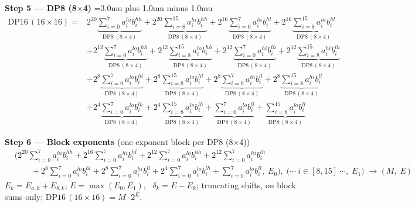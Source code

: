 \documentclass[fleqn]{article}
\newcommand{\DPop}[3]{\mathrm{DP#1}\,(#2\!\times\!#3)}
\begin{document}
\textbf{Step 5 --- DP8 (8$\times$4)}
{\medmuskip=3.0mu plus 1.0mu minus 1.0mu
\begin{align*}
\DPop{16}{16}{16} = {}
  & 2^{20} \underbrace{\sum_{i=0}^{7} a_i^{hi} b_i^{hh}}_{\DPop{8}{8}{4}}
  + 2^{20} \underbrace{\sum_{i=8}^{15} a_i^{hi} b_i^{hh}}_{\DPop{8}{8}{4}}
  + 2^{16} \underbrace{\sum_{i=0}^{7} a_i^{hi} b_i^{hl}}_{\DPop{8}{8}{4}}
  + 2^{16} \underbrace{\sum_{i=8}^{15} a_i^{hi} b_i^{hl}}_{\DPop{8}{8}{4}} \\[0.3em]
  & + 2^{12} \underbrace{\sum_{i=0}^{7} a_i^{lo} b_i^{hh}}_{\DPop{8}{8}{4}}
  + 2^{12} \underbrace{\sum_{i=8}^{15} a_i^{lo} b_i^{hh}}_{\DPop{8}{8}{4}}
  + 2^{12} \underbrace{\sum_{i=0}^{7} a_i^{hi} b_i^{lh}}_{\DPop{8}{8}{4}}
  + 2^{12} \underbrace{\sum_{i=8}^{15} a_i^{hi} b_i^{lh}}_{\DPop{8}{8}{4}} \\[0.3em]
  & + 2^{8} \underbrace{\sum_{i=0}^{7} a_i^{lo} b_i^{hl}}_{\DPop{8}{8}{4}}
  + 2^{8} \underbrace{\sum_{i=8}^{15} a_i^{lo} b_i^{hl}}_{\DPop{8}{8}{4}}
  + 2^{8} \underbrace{\sum_{i=0}^{7} a_i^{hi} b_i^{ll}}_{\DPop{8}{8}{4}}
  + 2^{8} \underbrace{\sum_{i=8}^{15} a_i^{hi} b_i^{ll}}_{\DPop{8}{8}{4}} \\[0.3em]
  & + 2^{4} \underbrace{\sum_{i=0}^{7} a_i^{lo} b_i^{lh}}_{\DPop{8}{8}{4}}
  + 2^{4} \underbrace{\sum_{i=8}^{15} a_i^{lo} b_i^{lh}}_{\DPop{8}{8}{4}}
  + \underbrace{\sum_{i=0}^{7} a_i^{lo} b_i^{ll}}_{\DPop{8}{8}{4}}
  + \underbrace{\sum_{i=8}^{15} a_i^{lo} b_i^{ll}}_{\DPop{8}{8}{4}}
\end{align*}
}

\textbf{Step 6 --- Block exponents}\quad
{\small(one exponent block per DP8 (8$\times$4))}
\begin{align*}
&\Big(2^{20}\!\sum_{i=0}^{7} a_i^{hi} b_i^{hh} + 2^{16}\!\sum_{i=0}^{7} a_i^{hi} b_i^{hl} + 2^{12}\!\sum_{i=0}^{7} a_i^{lo} b_i^{hh} + 2^{12}\!\sum_{i=0}^{7} a_i^{hi} b_i^{lh} \\
&\qquad + 2^{8}\!\sum_{i=0}^{7} a_i^{lo} b_i^{hl} + 2^{8}\!\sum_{i=0}^{7} a_i^{hi} b_i^{ll} + 2^{4}\!\sum_{i=0}^{7} a_i^{lo} b_i^{lh} + \sum_{i=0}^{7} a_i^{lo} b_i^{ll},\; E_0\Big) ,\;
\Big(\cdots\ i\!\in\![8,15]\ \cdots,\; E_1\Big)
\;\longrightarrow\;
\Big(\, M ,\; E \,\Big)
\end{align*}
$E_k=E_{a,k}+E_{b,k}$; \quad $E=\max(E_0,E_1)$, \ $\delta_k=E-E_k$; \quad truncating shifts, on block sums only; \quad $\DPop{16}{16}{16}=M\cdot2^{E}$.
\end{document}
